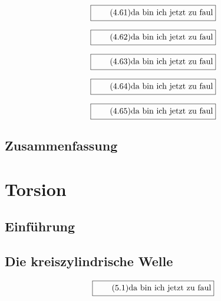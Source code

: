 \documentclass[11pt]{article}
\newcommand{\1}{ {\mathds{1}} }
\begin{document}
		\begin{equation}
			\boxed{
				\tag{4.61}
				\begin{split}
					\text{da bin ich jetzt zu faul}
				\end{split}
			}
		\end{equation}

		\begin{equation}
			\boxed{
				\tag{4.62}
				\begin{split}
					\text{da bin ich jetzt zu faul}
				\end{split}
			}
		\end{equation}
		
		\begin{equation}
			\boxed{
				\tag{4.63}
				\begin{split}
					\text{da bin ich jetzt zu faul}
				\end{split}
			}
		\end{equation}

		\begin{equation}
			\boxed{
				\tag{4.64}
				\begin{split}
					\text{da bin ich jetzt zu faul}
				\end{split}
			}
		\end{equation}

		\begin{equation}
			\boxed{
				\tag{4.65}
				\begin{split}
					\text{da bin ich jetzt zu faul}
				\end{split}
			}
		\end{equation}

		\subsection{Zusammenfassung}
	
		\section{Torsion}
		\subsection{Einführung}
		\subsection{Die kreiszylindrische Welle}

		\begin{equation}
			\boxed{
				\tag{5.1}
				\begin{split}
					\text{da bin ich jetzt zu faul}
				\end{split}
			}
		\end{equation}
		
\end{document}
